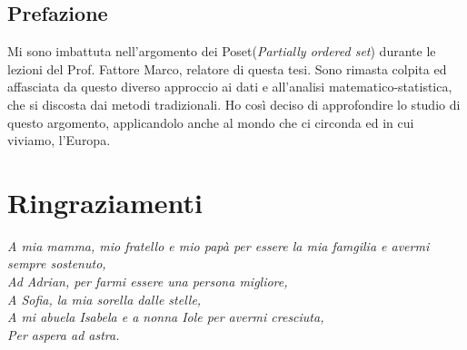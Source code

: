 \documentclass[a4paper,12pt, openright]{report}
\newcommand\blankpage{%
    \null
    \thispagestyle{empty}%
    \addtocounter{page}{-1}%
    \newpage}
\begin{document}
\newpage
    

\begin{center}
    \chapter*{\centering Prefazione}
    Mi sono imbattuta nell'argomento dei Poset(\textit{Partially ordered set}) durante le lezioni del Prof. Fattore Marco, relatore di questa tesi. Sono rimasta 
    colpita ed affasciata da questo diverso approccio ai dati e all'analisi matematico-statistica, che si discosta dai metodi tradizionali. Ho così deciso di 
    approfondire lo studio di questo argomento, applicandolo anche al mondo che ci circonda ed in cui viviamo, l'Europa. 
\end{center}

\afterpage{\blankpage}

\newpage
\begingroup
\let\clearpage\endgroup
\chapter*{\centering Ringraziamenti}
\begin{flushright}
    \textit{
        A mia mamma, mio fratello e mio papà per essere la mia famgilia e avermi sempre sostenuto, \\
        Ad Adrian, per farmi essere una persona migliore, \\
        A Sofia, la mia sorella dalle stelle, \\
        A mi abuela Isabela e a nonna Iole per avermi cresciuta, \\
        \vspace{5mm} %
        Per aspera ad astra.
    }

\end{flushright}

\newpage
\end{document}
